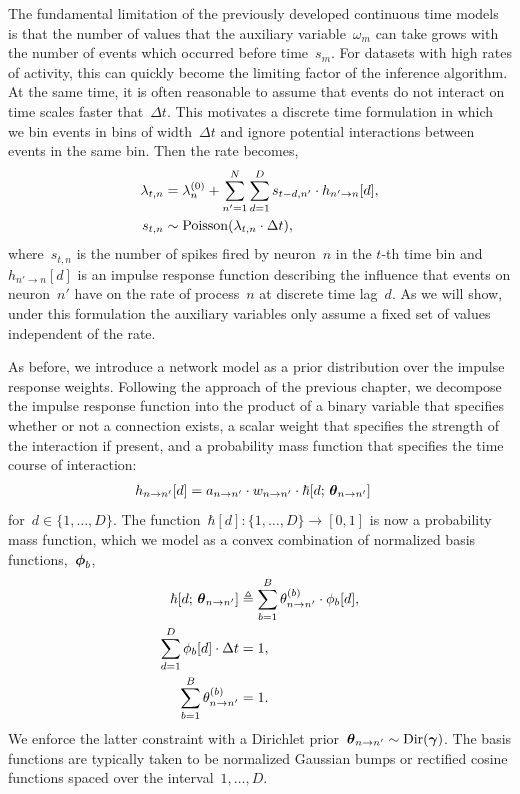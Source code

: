 The fundamental limitation of the previously developed continuous time
models is that the number of values that the auxiliary
variable~$\omega_m$ can take grows with the number of events which
occurred before time~$s_{m}$. For datasets with high rates of
activity, this can quickly become the limiting factor of the inference
algorithm.  At the same time, it is often reasonable to assume that
events do not interact on time scales faster that~$\Delta t$. This
motivates a discrete time formulation in which we bin events in bins
of width~$\Delta t$ and ignore potential interactions between events
in the same bin. Then the rate becomes,
\begin{align}
\label{eq:disc_hawkes_rate}
\lambda_{t,n} &= \lambda_n^{(0)} +
\sum_{n' = 1}^N \sum_{d=1}^{D} s_{t-d,n'} \cdot h_{n' \to n}[d], \\
s_{t,n} &\sim \mathrm{Poisson}(\lambda_{t,n} \cdot \Delta t),
\end{align}
where~$s_{t,n}$ is the number of spikes fired by neuron~$n$ in the
$t$-th time bin and~${h_{n' \to n}[d]}$ is an impulse response
function describing the influence that events on neuron~$n'$ have on
the rate of process~$n$ at discrete time lag~${d}$. As we will show,
under this formulation the auxiliary variables only assume a fixed set
of values independent of the rate.

As before, we introduce a network model as a prior distribution over
the impulse response weights. Following the approach of the previous
chapter, we decompose the impulse response function into the product
of a binary variable that specifies whether or not a connection
exists, a scalar weight that specifies the strength of the interaction
if present, and a probability mass function that specifies the time
course of interaction:
\begin{align*}
  h_{n \to n'}[d]
  &= a_{n \to n'} \cdot w_{n \to n'} \cdot \hbar[d; \, \boldsymbol{\theta}_{n \to n'}] 
\end{align*}
for~${d \in\{1,\ldots,D\}}$.  
The function~${\hbar[d]: \{1, \ldots, D\} \to
  [0,1]}$ is now a probability mass function, which we model as a convex
combination of normalized basis functions,~$\boldsymbol{\phi}_b$,
\begin{align*}
  \hbar[d; \, \boldsymbol{\theta}_{n \to n'}]
  &\triangleq \sum_{b=1}^B \theta_{n \to n'}^{(b)} \cdot \phi_b[d], \\
  \sum_{d=1}^D \phi_b[d] \cdot \Delta t  &= 1, \\
  \sum_{b=1}^B \theta_{n \to n'}^{(b)} &= 1.
\end{align*}
We enforce the latter constraint with a Dirichlet
prior~${\boldsymbol{\theta}_{n \to n'} \sim \mathrm{Dir}(\boldsymbol{\gamma})}$.
The basis functions are typically taken to be normalized Gaussian bumps or
rectified cosine functions spaced over the interval~${1,\ldots,D}$.

